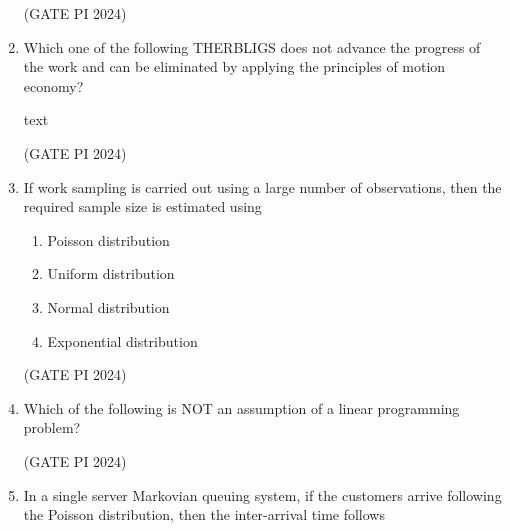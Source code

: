 \documentclass[journal,12pt,onecolumn]{IEEEtran}
\theoremstyle{remark}
\begin{document}
\begin{enumerate}
\hfill (GATE PI 2024)

\item Which one of the following THERBLIGS does not advance the progress of the work and can be eliminated by applying the principles of motion economy?

text
\begin{enumerate}
\end{enumerate}

\hfill (GATE PI 2024)

\item If work sampling is carried out using a large number of observations, then the required sample size is estimated using

\begin{multicols}{2}
\begin{enumerate}
    \item Poisson distribution
    \item Uniform distribution
    \item Normal distribution
    \item Exponential distribution
\end{enumerate}
\end{multicols}

\hfill (GATE PI 2024)

\item Which of the following is NOT an assumption of a linear programming problem?

\begin{enumerate}
\end{enumerate}

\hfill (GATE PI 2024)

\item In a single server Markovian queuing system, if the customers arrive following the Poisson distribution, then the inter-arrival time follows


\end{enumerate}
\end{document}
